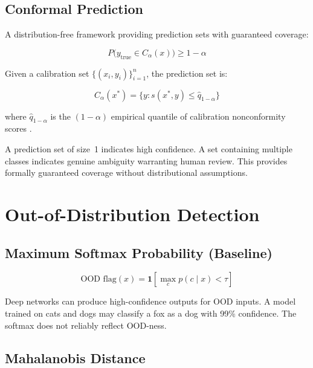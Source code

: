 \subsection{Conformal Prediction}

A distribution-free framework providing prediction sets with guaranteed coverage:

\[
P\bigl(y_{\text{true}} \in C_\alpha(x)\bigr) \geq 1 - \alpha
\]

Given a calibration set $\{(x_i, y_i)\}_{i=1}^n$, the prediction set is:

\[
C_\alpha(x^*) = \{y : s(x^*, y) \leq \hat{q}_{1-\alpha}\}
\]

where $\hat{q}_{1-\alpha}$ is the $(1-\alpha)$ empirical quantile of calibration nonconformity scores \autocite{angelopoulos2021gentle}.

\begin{examplebox}
A prediction set of size~1 indicates high confidence. A set containing multiple classes indicates genuine ambiguity warranting human review. This provides formally guaranteed coverage without distributional assumptions.
\end{examplebox}

\section{Out-of-Distribution Detection}

\subsection{Maximum Softmax Probability (Baseline)}

\[
\text{OOD flag}(x) = \mathbf{1}\!\left[\max_c p(c\mid x) < \tau\right]
\]

\begin{cautionbox}
Deep networks can produce high-confidence outputs for OOD inputs. A model trained on cats and dogs may classify a fox as a dog with 99\% confidence. The softmax does not reliably reflect OOD-ness.
\end{cautionbox}

\subsection{Mahalanobis Distance}

